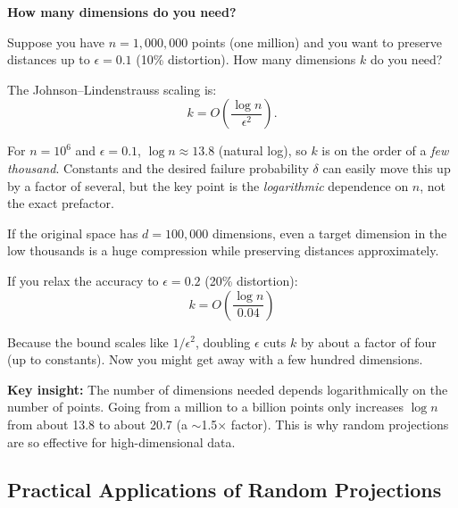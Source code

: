 \begin{examplebox}
\textbf{How many dimensions do you need?}

\vspace{0.5em}

Suppose you have $n = 1{,}000{,}000$ points (one million) and you want to preserve distances up to $\epsilon = 0.1$ (10\% distortion). How many dimensions $k$ do you need?

\vspace{0.5em}

The Johnson--Lindenstrauss scaling is:
\begin{equation*}
k = O\left(\frac{\log n}{\epsilon^2}\right).
\end{equation*}

For $n = 10^6$ and $\epsilon = 0.1$, $\log n \approx 13.8$ (natural log), so $k$ is on the order of a \emph{few thousand}. Constants and the desired failure probability $\delta$ can easily move this up by a factor of several, but the key point is the \emph{logarithmic} dependence on $n$, not the exact prefactor.

If the original space has $d = 100{,}000$ dimensions, even a target dimension in the low thousands is a huge compression while preserving distances approximately.

\vspace{0.5em}

If you relax the accuracy to $\epsilon = 0.2$ (20\% distortion):
\begin{equation*}
k = O\left(\frac{\log n}{0.04}\right)
\end{equation*}

Because the bound scales like $1/\epsilon^2$, doubling $\epsilon$ cuts $k$ by about a factor of four (up to constants). Now you might get away with a few hundred dimensions.

\vspace{0.5em}

\textbf{Key insight:} The number of dimensions needed depends logarithmically on the number of points. Going from a million to a billion points only increases $\log n$ from about 13.8 to about 20.7 (a $\sim$1.5$\times$ factor). This is why random projections are so effective for high-dimensional data.
\end{examplebox}

\vspace{1.5em}

\subsection{Practical Applications of Random Projections}

